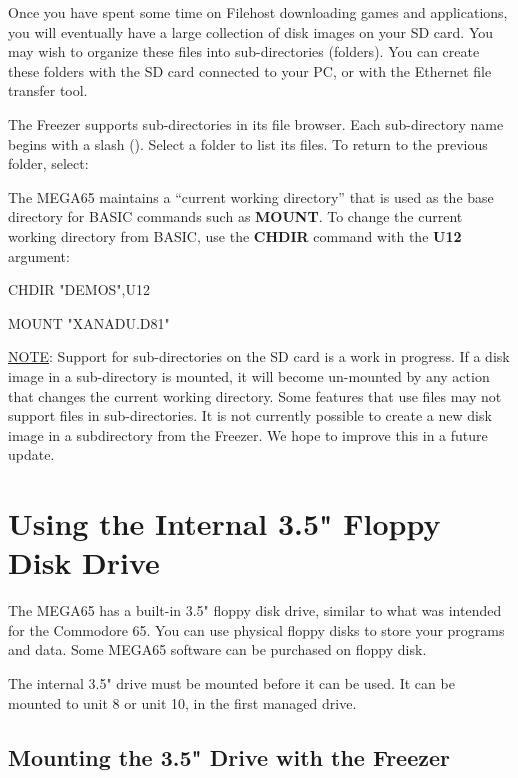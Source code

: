 Once you have spent some time on Filehost downloading games and applications, you will eventually have a large collection of disk images on your SD card. You may wish to organize these files into sub-directories (folders). You can create these folders with the SD card connected to your PC, or with the Ethernet file transfer tool.

The Freezer supports sub-directories in its file browser. Each sub-directory name begins with a slash (\screentext{/}). Select a folder to list its files. To return to the previous folder, select: 

The MEGA65 maintains a ``current working directory'' that is used as the base directory for BASIC commands such as {\bf MOUNT}. To change the current working directory from BASIC, use the {\bf CHDIR} command with the {\bf U12} argument:

\begin{screencode}
CHDIR "DEMOS",U12

MOUNT "XANADU.D81"
\end{screencode}

\underline{NOTE}: Support for sub-directories on the SD card is a work in progress. If a disk image in a sub-directory is mounted, it will become un-mounted by any action that changes the current working directory. Some features that use files may not support files in sub-directories. It is not currently possible to create a new disk image in a subdirectory from the Freezer. We hope to improve this in a future update.


\section{Using the Internal 3.5" Floppy Disk Drive}

The MEGA65 has a built-in 3.5" floppy disk drive, similar to what was intended for the Commodore 65. You can use physical floppy disks to store your programs and data. Some MEGA65 software can be purchased on floppy disk.

The internal 3.5" drive must be mounted before it can be used. It can be mounted to unit 8 or unit 10, in the first managed drive.

\subsection{Mounting the 3.5" Drive with the Freezer}


